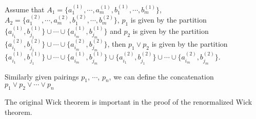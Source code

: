 \begin{defn}
\begin{enumerate}
    Assume that $A_1=\{a^{(1)}_1,\cdots,a^{(1)}_{m}, b^{(1)}_1, \cdots,b^{(1)}_m\}$, $A_2=\{a^{(2)}_1,\cdots,a^{(2)}_{m}, b^{(2)}_1, \cdots,b^{(2)}_m\}$, $p_1$ is given by the partition $\{a^{(1)}_{i_1},b^{(1)}_{j_1}\}\cup\cdots\cup \{a^{(1)}_{i_{m}},b^{(1)}_{j_m}\}$ and $p_2$ is given by the partition $\{a^{(2)}_{i_1},b^{(2)}_{j_1}\}\cup\cdots\cup \{a^{(2)}_{i_{m}},b^{(2)}_{j_m}\}$, then $p_1\vee p_2$ is given by the partition $\{a^{(1)}_{i_1},b^{(1)}_{j_1}\}\cup\cdots\cup \{a^{(1)}_{i_{m}},b^{(1)}_{j_m}\}\cup \{a^{(2)}_{i_1},b^{(2)}_{j_1}\}\cup\cdots\cup \{a^{(2)}_{i_{m}},b^{(2)}_{j_m}\}$.

    Similarly given pairings $p_1$, $\cdots$, $p_n$, we can define the concatenation $p_1\vee p_2\vee\cdots\vee p_n$
\end{enumerate}




\end{defn}

The original Wick theorem is important in the proof of the renormalized Wick theorem.


